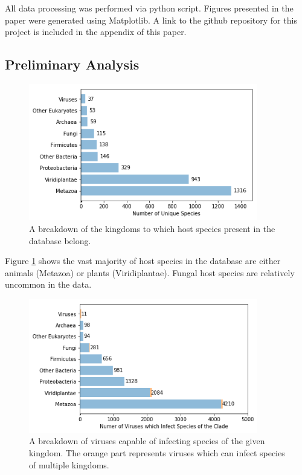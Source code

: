 \documentclass[12pt]{article}
\begin{document}
    All data processing was performed via python script. Figures presented in the
    paper were generated using Matplotlib. A link to the github repository for this
    project is included in the appendix of this paper.

    \subsection{Preliminary Analysis}

    \begin{figure}[H]
        \begin{center}
            \includegraphics[width=100mm]{host_clades_figure.png}
            \caption{A breakdown of the kingdoms to which host species present in
            the database belong.}
            \label{host_clades_figure}
        \end{center}
    \end{figure}

    Figure \ref{host_clades_figure} shows the vast majority of host species in
    the database are either animals (Metazoa) or plants (Viridiplantae). Fungal
    host species are relatively uncommon in the data.

    \begin{figure}[H]
        \begin{center}
            \includegraphics[width=100mm]{infects_clades_figure.png}
            \caption{A breakdown of viruses capable of infecting species of
            the given kingdom. The orange part represents viruses which can
            infect species of multiple kingdoms.}
            \label{infects_clades_figure}
        \end{center}
    \end{figure}
\end{document}
